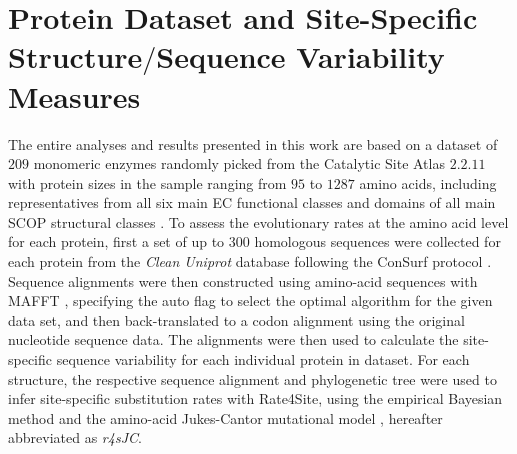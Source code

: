 \documentclass[11pt]{article}
\begin{document}


\section{Protein Dataset and Site-Specific Structure$/$Sequence Variability Measures}
\label{sec:methods}

    The entire analyses and results presented in this work are based on a dataset of $209$ monomeric enzymes \citep[e.g.,][]{yeh_site-specific_2014, echave_relationship_2014} randomly picked from the Catalytic Site Atlas $2.2.11$ \citep[][]{porter_catalytic_2004} with protein sizes in the sample ranging from $95$ to $1287$ amino acids, including representatives from all six main EC functional classes \citep[][]{webb_enzyme_1992} and domains of all main SCOP structural classes \citep[][]{murzin_scop:_1995}. To assess the evolutionary rates at the amino acid level for each protein, first a set of up to $300$ homologous sequences were collected \citep{yeh_site-specific_2014} for each protein from the {\it Clean Uniprot} database following the ConSurf protocol \citep[][]{goldenberg_consurf-db:_2009, ashkenazy_consurf_2010}. Sequence alignments were then constructed using amino-acid sequences with MAFFT \citep[][]{katoh_mafft_2005}, specifying the auto flag to select the optimal algorithm for the given data set, and then back-translated to a codon alignment using the original nucleotide sequence data. The alignments were then used to calculate the site-specific sequence variability for each individual protein in dataset. For each structure, the respective sequence alignment and phylogenetic tree were used to infer site-specific substitution rates with Rate4Site, using the empirical Bayesian method and the amino-acid Jukes-Cantor mutational model \citep[][]{mayrose_comparison_2004}, hereafter abbreviated as {\it r4sJC}. \\
\end{document}
